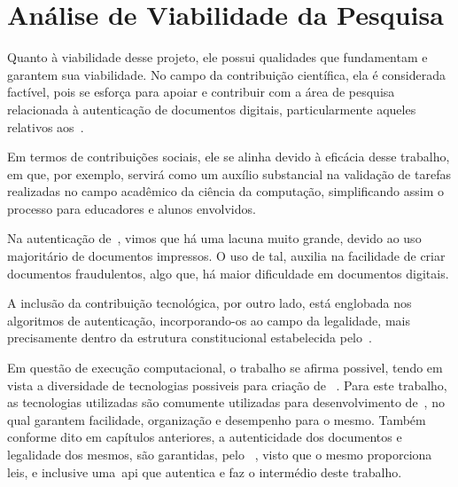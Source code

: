 \newcommand{\footnotegantt}{
    \footnote{O Gráfico de Gantt, também conhecido como Diagrama de Gantt,
        é uma ferramenta visual para controlar o cronograma de um projeto ou
        de uma programação de produção, ajudando a avaliar os prazos de
        entrega e os recursos críticos.
        Disponível em:
        \url{https://www.nomus.com.br/blog-industrial/grafico-de-gantt/}
    }
}
\chapter{Análise de Viabilidade da Pesquisa}
\label{ch:analise-de-viabilidade-da-pesquisa}

Quanto à viabilidade desse projeto, ele possui qualidades que fundamentam e
garantem sua viabilidade.
No campo da contribuição científica, ela é considerada factível, pois se esforça para
apoiar e contribuir com a área de pesquisa relacionada à autenticação de documentos
digitais, particularmente aqueles relativos aos~.

Em termos de contribuições sociais, ele se alinha devido à eficácia desse trabalho,
em que, por exemplo, servirá como um auxílio substancial na validação de tarefas
realizadas no campo acadêmico da ciência da computação, simplificando assim o
processo para educadores e alunos envolvidos.

Na autenticação de~, vimos que há uma lacuna muito grande,
devido ao uso majoritário de documentos impressos.
O uso de tal, auxilia na facilidade de criar documentos fraudulentos, algo que,
há maior dificuldade em documentos digitais.

A inclusão da contribuição tecnológica, por outro lado, está englobada nos algoritmos
de autenticação, incorporando-os ao campo da legalidade, mais precisamente dentro
da estrutura constitucional estabelecida pelo~\citeauthor*{govbr2020}.

Em questão de execução computacional, o trabalho se afirma possivel,
tendo em vista a diversidade de tecnologias possiveis para criação de
~.
Para este trabalho, as tecnologias utilizadas são comumente utilizadas para
desenvolvimento de~, no qual garantem facilidade, organização
e desempenho para o mesmo.
Também conforme dito em capítulos anteriores, a autenticidade dos documentos
e legalidade dos mesmos, são garantidas, pelo ~\citeauthor*{govbr2020},
visto que o mesmo proporciona leis, e inclusive uma~\acrshort{api} que
autentica e faz o intermédio deste trabalho.

